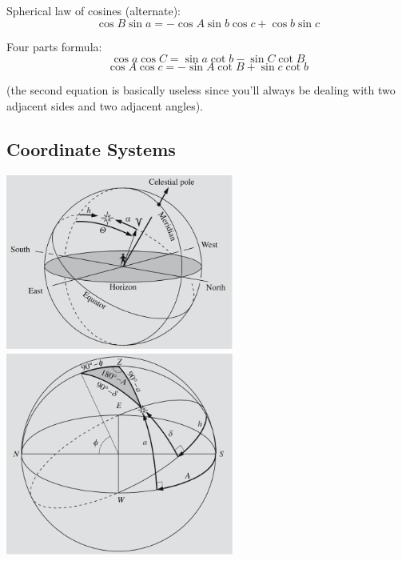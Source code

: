 \documentclass[12pt]{article}
\begin{document}
Spherical law of cosines (alternate): 
\begin{equation*}
    \cos{B}\sin{a} = -\cos{A}\sin{b}\cos{c}+\cos{b}\sin{c}
\end{equation*}

Four parts formula: 
\begin{equation*}
    \cos{a}\cos{C} = \sin{a}\cot{b} - \sin{C}\cot{B}
\end{equation*}
\begin{equation*}
    \cos{A}\cos{c} = -\sin{A}\cot{B} + \sin{c}\cot{b}
\end{equation*}

(the second equation is basically useless since you'll always be dealing with two adjacent sides and two adjacent angles).

\subsection{Coordinate Systems}


\begin{center}
\includegraphics[width=7.5cm]{images/rah.png}
\includegraphics[width=7.5cm]{images/conversion.png}
\end{center}
\end{document}
